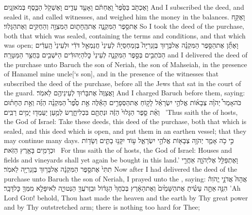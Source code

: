 {וָאֶכְתֹּ֤ב בַּסֵּ֙פֶר֙ וָֽאֶחְתֹּ֔ם וָאָעֵ֖ד עֵדִ֑ים וָאֶשְׁקֹ֥ל הַכֶּ֖סֶף בְּמֹאזְנָֽיִם׃}
{And I subscribed the deed, and sealed it, and called witnesses, and weighed him the money in the balances.}
{וָאֶקַּ֖ח אֶת\maqqaf סֵ֣פֶר הַמִּקְנָ֑ה אֶת\maqqaf הֶֽחָת֛וּם הַמִּצְוָ֥ה וְהַחֻקִּ֖ים וְאֶת\maqqaf הַגָּלֽוּי׃}
{So I took the deed of the purchase, both that which was sealed, containing the terms and conditions, and that which was open;}
{וָאֶתֵּ֞ן אֶת\maqqaf הַסֵּ֣פֶר הַמִּקְנָ֗ה אֶל\maqqaf בָּר֣וּךְ בֶּן\maqqaf נֵרִיָּה֮ בֶּן\maqqaf מַחְסֵיָה֒ לְעֵינֵי֙ חֲנַמְאֵ֣ל דֹּדִ֔י וּלְעֵינֵי֙ הָֽעֵדִ֔ים הַכֹּתְבִ֖ים בְּסֵ֣פֶר הַמִּקְנָ֑ה לְעֵינֵי֙ כׇּל\maqqaf הַיְּהוּדִ֔ים הַיֹּשְׁבִ֖ים בַּחֲצַ֥ר הַמַּטָּרָֽה׃}
{and I delivered the deed of the purchase unto Baruch the son of Neriah, the son of Mahseiah, in the presence of Hanamel mine uncle[‘s son], and in the presence of the witnesses that subscribed the deed of the purchase, before all the Jews that sat in the court of the guard.}
{וָאֲצַוֶּה֙ אֶת\maqqaf בָּר֔וּךְ לְעֵינֵיהֶ֖ם לֵאמֹֽר׃}
{And I charged Baruch before them, saying:}
{כֹּה\maqqaf אָמַר֩ יְהֹוָ֨ה צְבָא֜וֹת אֱלֹהֵ֣י יִשְׂרָאֵ֗ל לָק֣וֹחַ אֶת\maqqaf הַסְּפָרִ֣ים הָאֵ֡לֶּה אֵ֣ת סֵ֩פֶר֩ הַמִּקְנָ֨ה הַזֶּ֜ה וְאֵ֣ת הֶחָת֗וּם וְאֵ֨ת סֵ֤פֶר הַגָּלוּי֙ הַזֶּ֔ה וּנְתַתָּ֖ם בִּכְלִי\maqqaf חָ֑רֶשׂ לְמַ֥עַן יַעַמְד֖וּ יָמִ֥ים רַבִּֽים׃ \setuma }
{’Thus saith the \lord\space of hosts, the God of Israel: Take these deeds, this deed of the purchase, both that which is sealed, and this deed which is open, and put them in an earthen vessel; that they may continue many days.}
{כִּ֣י כֹ֥ה אָמַ֛ר יְהֹוָ֥ה צְבָא֖וֹת אֱלֹהֵ֣י יִשְׂרָאֵ֑ל ע֣וֹד יִקָּנ֥וּ בָתִּ֛ים וְשָׂד֥וֹת וּכְרָמִ֖ים בָּאָ֥רֶץ הַזֹּֽאת׃ \petucha }
{For thus saith the \lord\space of hosts, the God of Israel: Houses and fields and vineyards shall yet again be bought in this land.’}
{וָאֶתְפַּלֵּ֖ל אֶל\maqqaf יְהֹוָ֑ה אַחֲרֵ֤י תִתִּי֙ אֶת\maqqaf סֵ֣פֶר הַמִּקְנָ֔ה אֶל\maqqaf בָּר֥וּךְ בֶּן\maqqaf נֵרִיָּ֖ה לֵאמֹֽר׃}
{Now after I had delivered the deed of the purchase unto Baruch the son of Neriah, I prayed unto the \lord, saying:}
{אֲהָהּ֮ אֲדֹנָ֣י יֱהֹוִה֒ הִנֵּ֣ה \legarmeh  אַתָּ֣ה עָשִׂ֗יתָ אֶת\maqqaf הַשָּׁמַ֙יִם֙ וְאֶת\maqqaf הָאָ֔רֶץ בְּכֹֽחֲךָ֙ הַגָּד֔וֹל וּבִֽזְרֹעֲךָ֖ הַנְּטוּיָ֑ה לֹֽא\maqqaf יִפָּלֵ֥א מִמְּךָ֖ כׇּל\maqqaf דָּבָֽר׃}
{’Ah Lord \textsc{God}! behold, Thou hast made the heaven and the earth by Thy great power and by Thy outstretched arm; there is nothing too hard for Thee;}
